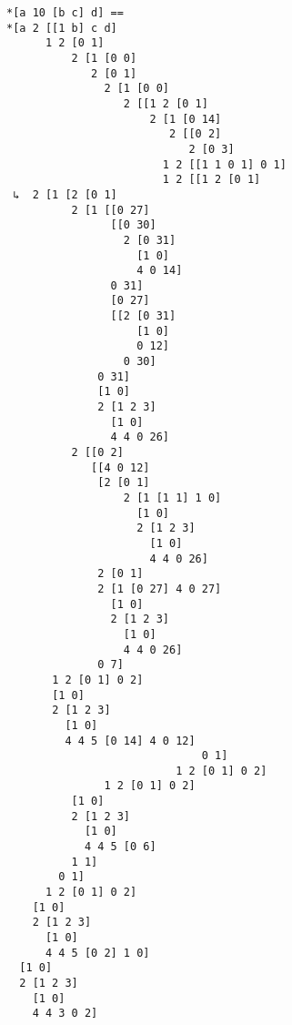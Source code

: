 \documentclass[twoside]{article}
\begin{document}
\begin{lstlisting}[style=listingcode]
*[a 10 [b c] d] ==
*[a 2 [[1 b] c d]
      1 2 [0 1]
          2 [1 [0 0]
             2 [0 1]
               2 [1 [0 0]
                  2 [[1 2 [0 1]
                      2 [1 [0 14]
                         2 [[0 2]
                            2 [0 3]
                        1 2 [[1 1 0 1] 0 1]
                        1 2 [[1 2 [0 1]
 ↳  2 [1 [2 [0 1]
          2 [1 [[0 27]
                [[0 30]
                  2 [0 31]
                    [1 0]
                    4 0 14]
                0 31]
                [0 27]
                [[2 [0 31]
                    [1 0]
                    0 12]
                  0 30]
              0 31]
              [1 0]
              2 [1 2 3]
                [1 0]
                4 4 0 26]
          2 [[0 2]
             [[4 0 12]
              [2 [0 1]
                  2 [1 [1 1] 1 0]
                    [1 0]
                    2 [1 2 3]
                      [1 0]
                      4 4 0 26]
              2 [0 1]
              2 [1 [0 27] 4 0 27]
                [1 0]
                2 [1 2 3]
                  [1 0]
                  4 4 0 26]
              0 7]
       1 2 [0 1] 0 2]
       [1 0]
       2 [1 2 3]
         [1 0]
         4 4 5 [0 14] 4 0 12]
                              0 1]
                          1 2 [0 1] 0 2]
               1 2 [0 1] 0 2]
          [1 0]
          2 [1 2 3]
            [1 0]
            4 4 5 [0 6]
          1 1]
        0 1]
      1 2 [0 1] 0 2]
    [1 0]
    2 [1 2 3]
      [1 0]
      4 4 5 [0 2] 1 0]
  [1 0]
  2 [1 2 3]
    [1 0]
    4 4 3 0 2]
\end{lstlisting}

\end{document}
